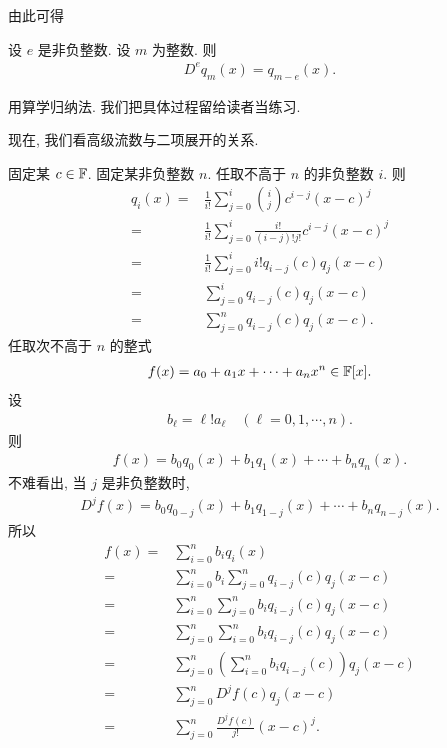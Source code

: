 由此可得

\begin{proposition}
    设 $e$ 是非负整数. 设 $m$ 为整数. 则
    \begin{align*}
        D^e q_m (x) = q_{m-e} (x).
    \end{align*}
\end{proposition}

\begin{pf}
    用算学归纳法. 我们把具体过程留给读者当练习.
\end{pf}

现在, 我们看高级流数与二项展开的关系.

固定某 $c \in \mathbb{F}$. 固定某非负整数 $n$. 任取不高于 $n$ 的非负整数 $i$. 则
\begin{align*}
    q_{i} (x)
    = {} & \frac{1}{i!} \sum_{j = 0}^{i} \binom{i}{j} c^{i - j} (x-c)^{j}           \\
    = {} & \frac{1}{i!} \sum_{j = 0}^{i} \frac{i!}{(i - j)! j!} c^{i - j} (x-c)^{j} \\
    = {} & \frac{1}{i!} \sum_{j = 0}^{i} i! q_{i-j} (c) q_{j} (x-c)                 \\
    = {} & \sum_{j = 0}^{i} q_{i-j} (c) q_{j} (x-c)                                 \\
    = {} & \sum_{j = 0}^{n} q_{i-j} (c) q_{j} (x-c).
\end{align*}
任取次不高于 $n$ 的整式
\begin{align*}
    f(x) = a_0 + a_1 x + \cdots + a_n x^n \in \mathbb{F}[x].
\end{align*}
设
\begin{align*}
    b_\ell = \ell! a_\ell \quad (\ell = 0,1,\cdots,n).
\end{align*}
则
\begin{align*}
    f(x) = b_0 q_0 (x) + b_1 q_1 (x) + \cdots + b_n q_n (x).
\end{align*}
不难看出, 当 $j$ 是非负整数时,
\begin{align*}
    D^j f(x) = b_0 q_{0-j} (x) + b_1 q_{1-j} (x) + \cdots + b_n q_{n-j} (x).
\end{align*}
所以
\begin{align*}
    f(x)
    = {} & \sum_{i = 0}^{n} b_i q_i (x)                                     \\
    = {} & \sum_{i = 0}^{n} b_i \sum_{j = 0}^{n} q_{i-j} (c) q_{j} (x-c)    \\
    = {} & \sum_{i = 0}^{n} \sum_{j = 0}^{n} b_i q_{i-j} (c) q_{j} (x-c)    \\
    = {} & \sum_{j = 0}^{n} \sum_{i = 0}^{n} b_i q_{i-j} (c) q_{j} (x-c)    \\
    = {} & \sum_{j = 0}^{n} \left( \sum_{i = 0}^{n} b_i q_{i-j} (c) \right)
    q_{j} (x-c)                                                             \\
    = {} & \sum_{j = 0}^{n} D^j f(c) q_{j} (x-c)                            \\
    = {} & \sum_{j = 0}^{n} \frac{D^j f(c)}{j!} (x-c)^j.
\end{align*}

